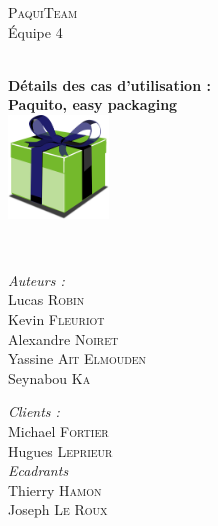 \begin{titlepage}
  \begin{center}
    
    
    \vfill
    
    \textsc{\LARGE PaquiTeam}\\
    \large Équipe 4\\[1.5cm]
    
    \HRule \\[0.4cm]
	   { \huge \bfseries Détails des cas d'utilisation :\\
	     Paquito, easy packaging\\[0.4cm]
	     \includegraphics[width=0.2\textwidth]{../img/paquito.png}
	     
	   }
	   \HRule \\[1.5cm]
	   
	   \begin{minipage}{0.40\textwidth}
	     \begin{flushleft} \large
	       \emph{Auteurs :}\\
	       Lucas \textsc{Robin}\\
	       Kevin \textsc{Fleuriot}\\
	       Alexandre \textsc{Noiret}\\
	       Yassine \textsc{Ait Elmouden}\\
	       Seynabou \textsc{Ka}
	     \end{flushleft}
	   \end{minipage}
	   \hfill
	   \begin{minipage}{0.40\textwidth}
	     \begin{flushright} \large
	       \emph{Clients :}\\
	       Michael \textsc{Fortier}\\
	       Hugues \textsc{Leprieur}\\
	       \emph{Ecadrants}\\
	       Thierry \textsc{Hamon}\\
	       Joseph \textsc{Le Roux}\\				
	     \end{flushright}
	   \end{minipage}


\end{center}
\end{titlepage}
